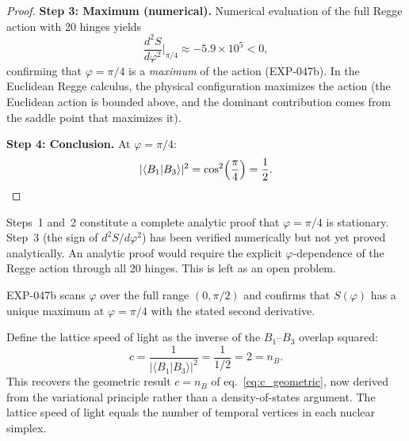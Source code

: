 \begin{proof}
\medskip\noindent\textbf{Step 3: Maximum (numerical).}
Numerical evaluation of the full Regge action with 20 hinges yields
\begin{equation}
\frac{d^2 S}{d\varphi^2}\bigg|_{\pi/4} \approx -5.9 \times 10^5 < 0,
\end{equation}
confirming that $\varphi = \pi/4$ is a \emph{maximum} of the action
(EXP-047b).  In the Euclidean Regge calculus, the physical
configuration maximizes the action (the Euclidean action is bounded
above, and the dominant contribution comes from the saddle point that
maximizes it).

\medskip\noindent\textbf{Step 4: Conclusion.}
At $\varphi = \pi/4$:
\begin{equation}
|\langle B_1 | B_3 \rangle|^2
= \cos^2\!\left(\frac{\pi}{4}\right)
= \frac{1}{2}. \qedhere
\end{equation}
\end{proof}

\begin{remark}
Steps~1 and~2 constitute a complete analytic proof that
$\varphi = \pi/4$ is stationary.  Step~3 (the sign of
$d^2S/d\varphi^2$) has been verified numerically but not yet proved
analytically.  An analytic proof would require the explicit
$\varphi$-dependence of the Regge action through all 20 hinges.  This
is left as an open problem.
\end{remark}

\begin{remark}
EXP-047b scans $\varphi$ over the full range $(0, \pi/2)$ and
confirms that $S(\varphi)$ has a unique maximum at $\varphi = \pi/4$
with the stated second derivative.
\end{remark}

\begin{corollary}\label{cor:speed_of_light}
Define the lattice speed of light as the inverse of the
$B_1$--$B_3$ overlap squared:
\begin{equation}
c = \frac{1}{|\langle B_1 | B_3 \rangle|^2} = \frac{1}{1/2} = 2 = n_B.
\end{equation}
This recovers the geometric result $c = n_B$ of
eq.~\eqref{eq:c_geometric}, now derived from the variational
principle rather than a density-of-states argument.  The lattice speed
of light equals the number of temporal vertices in each nuclear
simplex.
\end{corollary}

